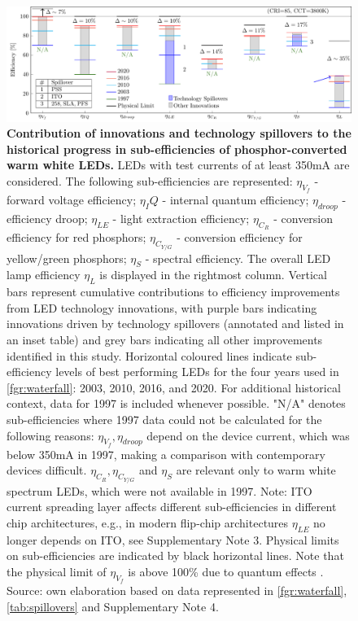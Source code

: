 \documentclass[parskip=full]{article}
\begin{document}
\begin{figure}[H]
 \centering
 \includegraphics[width=\textwidth]{figures/breakthroughs_efficiency.pdf}
 \caption{\textbf{Contribution of innovations and technology spillovers to the historical progress in sub-efficiencies of phosphor-converted warm white LEDs.} LEDs with test currents of at least 350mA are considered. The following sub-efficiencies are represented: $\eta_{V_f}$ - forward voltage efficiency; $\eta_IQ$ - internal quantum efficiency; $\eta_{droop}$ - efficiency droop; $\eta_{LE}$ - light extraction efficiency; $\eta_{C_R}$ - conversion efficiency for red phosphors; $\eta_{C_{Y/G}}$ - conversion efficiency for yellow/green phosphors; $\eta_S$ - spectral efficiency. The overall LED lamp efficiency $\eta_L$ is displayed in the rightmost column. Vertical bars represent cumulative contributions to efficiency improvements from LED technology innovations, with purple bars indicating innovations driven by technology spillovers (annotated and listed in an inset table) and grey bars indicating all other improvements identified in this study. Horizontal coloured lines indicate sub-efficiency levels of best performing LEDs for the four years used in \cref{fgr:waterfall}: 2003, 2010, 2016, and 2020. For additional historical context, data for 1997 is included whenever possible. "N/A" denotes sub-efficiencies where 1997 data could not be calculated for the following reasons: $\eta_{V_f}, \eta_{droop}$ depend on the device current, which was below 350mA in 1997, making a comparison with contemporary devices difficult. $\eta_{C_R}, \eta_{C_{Y/G}}$ and $\eta_S$ are relevant only to warm white spectrum LEDs, which were not available in 1997. Note: ITO current spreading layer affects different sub-efficiencies in different chip architectures, e.g., in modern flip-chip architectures $\eta_{LE}$ no longer depends on ITO, see Supplementary Note 3. Physical limits on sub-efficiencies are indicated by black horizontal lines. Note that the physical limit of $\eta_{V_f}$ is above 100\% due to quantum effects \cite{david2016electrical}. Source: own elaboration based on data represented in \cref{fgr:waterfall}, \cref{tab:spillovers} and Supplementary Note 4.}
 \label{fgr:breakthroughs_efficiency}
\end{figure}
\end{document}
